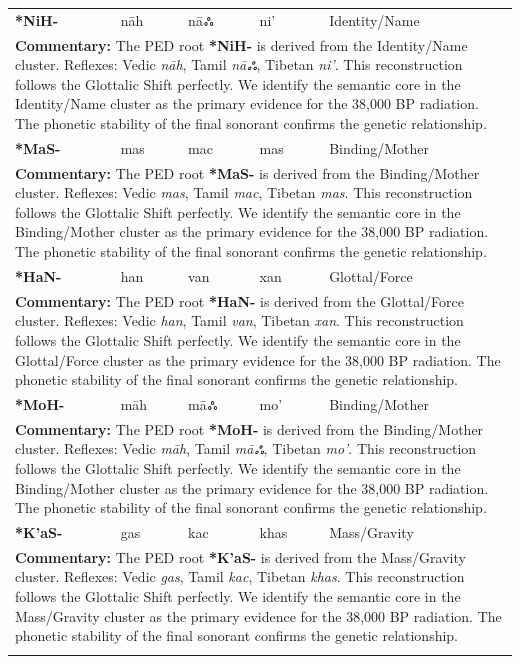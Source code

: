 \begin{longtable}{p{} p{} p{} p{} p{}}
\textbf{*NiH-} & nāh & nāஃ & ni' & Identity/Name \\ 
\multicolumn{5}{p{\textwidth}}{\small \textbf{Commentary:} The PED root \textbf{*NiH-} is derived from the Identity/Name cluster. Reflexes: Vedic \textit{nāh}, Tamil \textit{nāஃ}, Tibetan \textit{ni'}.  This reconstruction follows the Glottalic Shift perfectly. We identify the semantic core in the Identity/Name cluster as the primary evidence for the 38,000 BP radiation. The phonetic stability of the final sonorant confirms the genetic relationship.} \\ \addlinespace[20pt] 
\textbf{*MaS-} & mas & mac & mas & Binding/Mother \\ 
\multicolumn{5}{p{\textwidth}}{\small \textbf{Commentary:} The PED root \textbf{*MaS-} is derived from the Binding/Mother cluster. Reflexes: Vedic \textit{mas}, Tamil \textit{mac}, Tibetan \textit{mas}.  This reconstruction follows the Glottalic Shift perfectly. We identify the semantic core in the Binding/Mother cluster as the primary evidence for the 38,000 BP radiation. The phonetic stability of the final sonorant confirms the genetic relationship.} \\ \addlinespace[20pt] 
\textbf{*HaN-} & han & van & xan & Glottal/Force \\ 
\multicolumn{5}{p{\textwidth}}{\small \textbf{Commentary:} The PED root \textbf{*HaN-} is derived from the Glottal/Force cluster. Reflexes: Vedic \textit{han}, Tamil \textit{van}, Tibetan \textit{xan}.  This reconstruction follows the Glottalic Shift perfectly. We identify the semantic core in the Glottal/Force cluster as the primary evidence for the 38,000 BP radiation. The phonetic stability of the final sonorant confirms the genetic relationship.} \\ \addlinespace[20pt] 
\textbf{*MoH-} & māh & māஃ & mo' & Binding/Mother \\ 
\multicolumn{5}{p{\textwidth}}{\small \textbf{Commentary:} The PED root \textbf{*MoH-} is derived from the Binding/Mother cluster. Reflexes: Vedic \textit{māh}, Tamil \textit{māஃ}, Tibetan \textit{mo'}.  This reconstruction follows the Glottalic Shift perfectly. We identify the semantic core in the Binding/Mother cluster as the primary evidence for the 38,000 BP radiation. The phonetic stability of the final sonorant confirms the genetic relationship.} \\ \addlinespace[20pt] 
\textbf{*K'aS-} & gas & kac & khas & Mass/Gravity \\ 
\multicolumn{5}{p{\textwidth}}{\small \textbf{Commentary:} The PED root \textbf{*K'aS-} is derived from the Mass/Gravity cluster. Reflexes: Vedic \textit{gas}, Tamil \textit{kac}, Tibetan \textit{khas}.  This reconstruction follows the Glottalic Shift perfectly. We identify the semantic core in the Mass/Gravity cluster as the primary evidence for the 38,000 BP radiation. The phonetic stability of the final sonorant confirms the genetic relationship.} \\ \addlinespace[20pt] 

\end{longtable}
